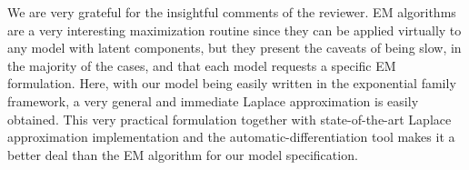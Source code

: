 \documentclass[a4paper,12pt]{article}
\begin{document}
We are very grateful for the insightful comments of the reviewer. EM
algorithms are a very interesting maximization routine since they can be
applied virtually to any model with latent components, but they present
the caveats of being slow, in the majority of the cases, and that each
model requests a specific EM formulation. Here, with our model being
easily written in the exponential family framework, a very general and
immediate Laplace approximation is easily obtained. This very practical
formulation together with state-of-the-art Laplace approximation
implementation and the automatic-differentiation tool makes it a better
deal than the EM algorithm for our model specification.

 
\end{document}

